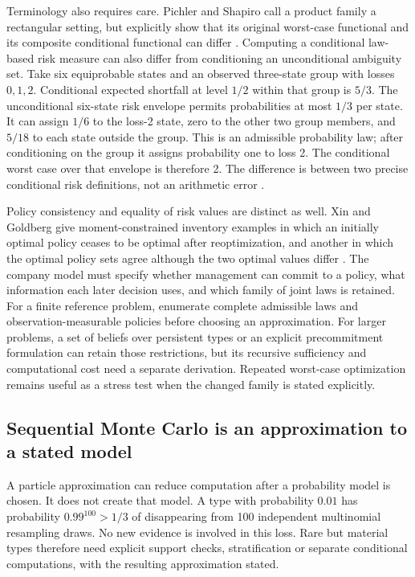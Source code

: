 \documentclass[11pt,a4paper]{article}
\begin{document}
Terminology also requires care. Pichler and Shapiro call a product family a
rectangular setting, but explicitly show that its original worst-case
functional and its composite conditional functional can differ
\cite[Section~4.2, Example~4.7]{pichlershapiro}. Computing a conditional
law-based risk measure can also differ from conditioning an unconditional
ambiguity set. Take six equiprobable states and an observed three-state
group with losses $0,1,2$. Conditional expected shortfall at level $1/2$
within that group is $5/3$. The unconditional six-state risk envelope permits
probabilities at most $1/3$ per state. It can assign $1/6$ to the loss-2 state,
zero to the other two group members, and $5/18$ to each state outside the
group. This is an admissible probability law; after conditioning on the group
it assigns probability one to loss 2. The conditional worst case over that
envelope is therefore 2. The difference is between two precise conditional
risk definitions, not an arithmetic error
\cite[Example~3.2 and equations~(3.1)--(3.5)]{pichlershapiro}.

Policy consistency and equality of risk values are distinct as well. Xin and
Goldberg give moment-constrained inventory examples in which an initially
optimal policy ceases to be optimal after reoptimization, and another in which
the optimal policy sets agree although the two optimal values differ
\cite[Definitions~3.1--3.3, Observations~5--7, proofs in Sections~6.3--6.5]{xingoldberg}.
The company model must specify whether management can commit to a policy,
what information each later decision uses, and which family of joint laws is
retained. For a finite reference problem, enumerate complete admissible laws
and observation-measurable policies before choosing an approximation. For
larger problems, a set of beliefs over persistent types or an explicit
precommitment formulation can retain those restrictions, but its recursive
sufficiency and computational cost need a separate derivation. Repeated
worst-case optimization remains useful as a stress test when the changed
family is stated explicitly.

\subsection{Sequential Monte Carlo is an approximation to a stated model}
A particle approximation can reduce computation after a probability model is
chosen. It does not create that model. A type with probability $0.01$ has
probability $0.99^{100}>1/3$ of disappearing from 100 independent multinomial
resampling draws. No new evidence is involved in this loss. Rare but material
types therefore need explicit support checks, stratification or separate
conditional computations, with the resulting approximation stated.
\end{document}
